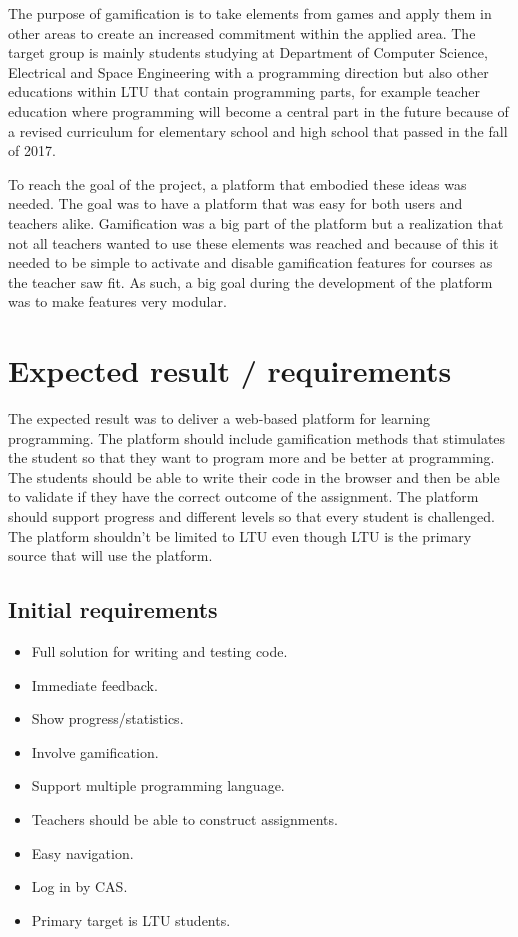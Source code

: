 The purpose of gamification is to take elements from games and apply them in other areas to create an increased commitment within the applied area.
The target group is mainly students studying at Department of Computer Science, Electrical and Space Engineering  with a programming direction but also other educations within LTU that contain programming parts, for example teacher education where programming will become a central part in the future because of a revised curriculum for elementary school and high school that passed in the fall of 2017.

To reach the goal of the project, a platform that embodied these ideas was needed.
The goal was to have a platform that was easy for both users and teachers alike. Gamification was a big part of the platform but a realization that not all teachers wanted to use these elements was reached and because of this it needed to be simple to activate and disable gamification features for courses as the teacher saw fit. As such, a big goal during the development of the platform was to make features very modular.

\section{Expected result / requirements}  
The expected result was to deliver a web-based platform for learning programming. The platform should include gamification methods that stimulates the student so that they want to program more and be better at programming. The students should be able to write their code in the browser and then be able to validate if they have the correct outcome of the assignment. The platform should support progress and different levels so that every student is challenged. The platform shouldn't be limited to LTU even though LTU is the primary source that will use the platform. 

\subsection{Initial requirements} 
 \begin{itemize}
\item Full solution for writing and testing code.
\item Immediate feedback.
\item Show progress/statistics.
\item Involve gamification.
\item Support multiple programming language.
\item Teachers should be able to construct assignments.
\item Easy navigation.
\item Log in by CAS. 
\item Primary target is LTU students.
 \end{itemize}
